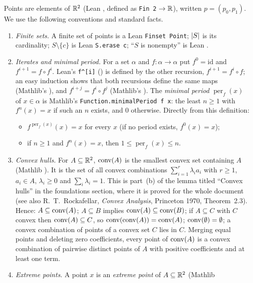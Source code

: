 Points are elements of $\mathbb R^2$ (Lean , defined as \texttt{Fin 2} $\to\mathbb R$), written $p=(p_0,p_1)$. We use
the following conventions and standard facts.
\begin{enumerate}[label=(C\arabic*)]
\item \emph{Finite sets.} A finite set of points is a Lean \texttt{Finset Point}; $\lvert S\rvert$ is its cardinality;
  $S\setminus\{c\}$ is Lean \texttt{S.erase c}; ``$S$ is nonempty'' is Lean .
\item \emph{Iterates and minimal period.} For a set $\alpha$ and $f:\alpha\to\alpha$ put $f^0=\mathrm{id}$ and
  $f^{i+1}=f\circ f^i$. Lean's \texttt{f\textasciicircum[i]} () is defined by the other recursion,
  $f^{i+1}=f^i\circ f$; an easy induction shows that both recursions define the same maps (Mathlib's
  ), and $f^{i+j}=f^i\circ f^j$ (Mathlib's ). The
  \emph{minimal period}
  $\operatorname{per}_f(x)$ of $x\in\alpha$ is Mathlib's \texttt{Function.minimalPeriod f x}: the least $n\ge1$ with
  $f^n(x)=x$ if such an $n$ exists, and $0$ otherwise. Directly from this definition:
  \begin{itemize}
  \item[(P1)] $f^{\operatorname{per}_f(x)}(x)=x$ for every $x$ (if no period exists, $f^0(x)=x$);
  \item[(P2)] if $n\ge1$ and $f^n(x)=x$, then $1\le\operatorname{per}_f(x)\le n$.
  \end{itemize}
\item \emph{Convex hulls.} For $A\subseteq\mathbb R^2$, $\operatorname{conv}(A)$ is the smallest convex set containing $A$ (Mathlib
  ). It is the set of all convex combinations $\sum_{i=1}^r\lambda_ia_i$ with $r\ge1$, $a_i\in A$,
  $\lambda_i\ge0$ and $\sum_i\lambda_i=1$. This is part~(b) of the lemma titled ``Convex hulls'' in the foundations
  section, where it is proved for the whole document (see also R.~T.~Rockafellar, \emph{Convex Analysis}, Princeton
  1970, Theorem~2.3). Hence: $A\subseteq\operatorname{conv}(A)$; $A\subseteq B$ implies $\operatorname{conv}(A)\subseteq\operatorname{conv}(B)$; if
  $A\subseteq C$ with $C$ convex
  then $\operatorname{conv}(A)\subseteq C$, so $\operatorname{conv}(\operatorname{conv}(A))=\operatorname{conv}(A)$; $\operatorname{conv}(\emptyset)=\emptyset$; a convex combination of
  points of a convex set $C$ lies in $C$. Merging equal points and deleting zero coefficients, every point of
  $\operatorname{conv}(A)$ is a convex combination of pairwise distinct points of $A$ with positive coefficients and at least one
  term.
\item \emph{Extreme points.} A point $x$ is an \emph{extreme point} of $A\subseteq\mathbb R^2$ (Mathlib

\end{enumerate}
